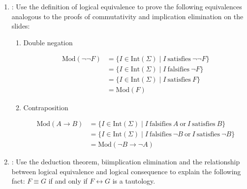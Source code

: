 \documentclass{acAssignment}
\begin{document}
\begin{enumerate}
    \item {}:
        Use the definition of logical equivalence to prove the following equivalences analogous to the proofs of commutativity and implication elimination on the slides:
        \begin{enumerate}
            \item Double negation
            
                \begin{acSolution}
                    \begin{align}
                        \mathrm{Mod}(\lnot \lnot F)
                            &= \{I \in \mathrm{Int}(\Sigma) \mid I ~\mathrm{satisfies}~ \lnot \lnot F\} \\
                            &= \{I \in \mathrm{Int}(\Sigma) \mid I ~\mathrm{falsifies}~ \lnot F\} \\
                            &= \{I \in \mathrm{Int}(\Sigma) \mid I ~\mathrm{satisfies}~ F\} \\
                            &= \mathrm{Mod}(F)
                    \end{align}
                \end{acSolution}
            
            \item Contraposition
            
                \begin{acSolution}
                    \begin{align}
                        \mathrm{Mod}(A \to B)
                            &= \{I \in \mathrm{Int}(\Sigma) \mid I ~\mathrm{falsifies}~ A ~\mathrm{or}~ I ~\mathrm{satisfies}~ B\} \\
                            &= \{I \in \mathrm{Int}(\Sigma) \mid I ~\mathrm{falsifies}~ \lnot B ~\mathrm{or}~ I ~\mathrm{satisfies}~ \lnot B\} \\
                            &= \mathrm{Mod}(\lnot B \to \lnot A)
                    \end{align}
                \end{acSolution}
        \end{enumerate}
        
    \item {}:
        Use the deduction theorem, biimplication elimination and the relationship between logical equivalence and logical consequence to explain the following fact: $F \equiv G$ if and only if $F \leftrightarrow G$ is a tautology.
        

\end{enumerate}
\end{document}
